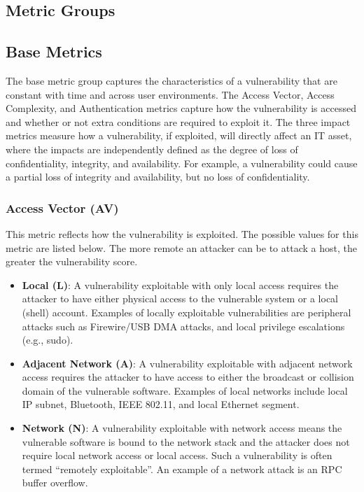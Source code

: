     \subsection{Metric Groups}\label{subsec:metric-groups}

    \subsection{Base Metrics}\label{subsec:base-metrics}

    The base metric group captures the characteristics of a vulnerability
    that are constant with time and across user environments. The Access
    Vector, Access Complexity, and Authentication metrics capture how the
    vulnerability is accessed and whether or not extra conditions are
    required to exploit it. The three impact metrics measure how a
    vulnerability, if exploited, will directly affect an IT asset, where the
    impacts are independently defined as the degree of loss of
    confidentiality, integrity, and availability. For example, a
    vulnerability could cause a partial loss of integrity and availability,
    but no loss of confidentiality.

    \subsubsection{Access Vector (AV)}\label{subsec:access-vector-av}

    This metric reflects how the vulnerability is exploited. The possible
    values for this metric are listed below. The more remote an
    attacker can be to attack a host, the greater the vulnerability score.

    \begin{itemize}
      \item
        \textbf{Local (L)}: A vulnerability exploitable with only local access
        requires the attacker to have either physical access to the vulnerable
        system or a local (shell) account. Examples of locally exploitable
        vulnerabilities are peripheral attacks such as Firewire/USB DMA
        attacks, and local privilege escalations (e.g., sudo).
      \item
        \textbf{Adjacent Network (A)}: A vulnerability exploitable with
        adjacent network access requires the attacker to have access to either
        the broadcast or collision domain of the vulnerable software. Examples
        of local networks include local IP subnet, Bluetooth, IEEE 802.11, and
        local Ethernet segment.
      \item
        \textbf{Network (N)}: A vulnerability exploitable with network access
        means the vulnerable software is bound to the network stack and the
        attacker does not require local network access or local access. Such a
        vulnerability is often termed ``remotely exploitable''. An example of
        a network attack is an RPC buffer overflow.
    \end{itemize}

